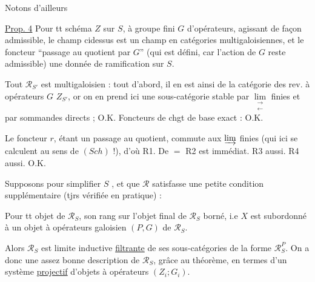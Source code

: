 Notons d'ailleurs

\uline{Prop. 4} Pour tt schéma  $Z$ sur \uline{$S$}, à groupe fini $G$ d'opérateurs,  agissant de façon admissible, le champ   cidessus est un champ en catégories multigaloisiennes, et le foncteur ``passage au quotient par $G$'' (qui est défini, car l'action de $G$ reste admissible)   une donnée de ramification sur $S$.

Tout $\mathscr R_{S'}$ est multigaloisien : tout d'abord, il en est ainsi de la catégorie des  rev. à opérateurs $G$  $Z_{S'}$, or on en prend ici une sous-catégorie stable par $\mathop{\mathrm{lim}}\limits_{\substack{\longrightarrow\\\longleftarrow}}$ finies et par sommandes directs ; O.K. Foncteurs de chgt de base exact : O.K.

Le foncteur $r$, étant un passage au quotient, commute aux $\varinjlim$ finies (qui ici se calculent au sens de $(Sch)$ !), d'où R1. De $=$ R2 est immédiat. R3 aussi. R4 aussi. O.K.

 Supposons pour simplifier $S$ , et que $\mathscr R$ satisfasse une petite condition supplémentaire (tjrs vérifiée en pratique) : 

Pour tt objet de $\mathscr R_S$, son rang sur l'objet final de $\mathscr R_S$  borné, i.e $X$ est subordonné à un  objet à opérateurs galoisien $(P,G)$ de $\mathscr R_S$.

Alors $\mathscr R_S$ est limite inductive \uline{filtrante} de ses sous-catégories de la forme $\mathscr R_S^P$. On a donc une assez bonne description de $\mathscr R_S$, grâce au théorème, en termes d'un système \uline{projectif} d'objets à opérateurs $(Z_i;G_i)$.
